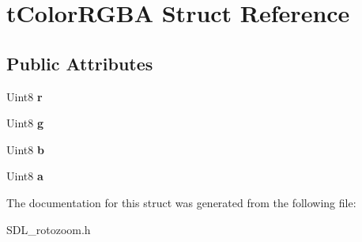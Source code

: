 \hypertarget{structtColorRGBA}{}\section{t\+Color\+R\+G\+BA Struct Reference}
\label{structtColorRGBA}
\subsection*{Public Attributes}
\begin{DoxyCompactItemize}
\item 
Uint8 {\bfseries r}\hypertarget{structtColorRGBA_a96efe754f0357efcfb2fa56447dfb76e}{}\label{structtColorRGBA_a96efe754f0357efcfb2fa56447dfb76e}

\item 
Uint8 {\bfseries g}\hypertarget{structtColorRGBA_a22f3efdc47c67f2672be345f7c7e8cb1}{}\label{structtColorRGBA_a22f3efdc47c67f2672be345f7c7e8cb1}

\item 
Uint8 {\bfseries b}\hypertarget{structtColorRGBA_ab6aa469c65af3c3bc56dd3657698c3b3}{}\label{structtColorRGBA_ab6aa469c65af3c3bc56dd3657698c3b3}

\item 
Uint8 {\bfseries a}\hypertarget{structtColorRGBA_a3177aa7ac55c6bdfa6288c6bc5e99628}{}\label{structtColorRGBA_a3177aa7ac55c6bdfa6288c6bc5e99628}

\end{DoxyCompactItemize}


The documentation for this struct was generated from the following file\+:\begin{DoxyCompactItemize}
\item 
S\+D\+L\+\_\+rotozoom.\+h\end{DoxyCompactItemize}
